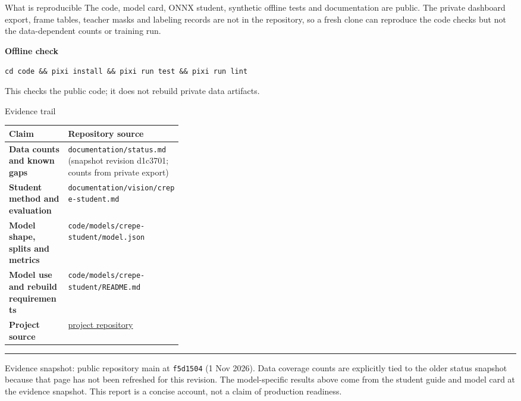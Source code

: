 \documentclass[10pt,a4paper]{article}
\makeatletter
\renewcommand\section{\@startsection{section}{1}{0pt}{9pt}{5pt}%
  {\normalfont\large\bfseries\color{ink}}}
\makeatother
\begin{document}
\section{What is reproducible}
The code, model card, ONNX student, synthetic offline tests and documentation
are public. The private dashboard export, frame tables, teacher masks and
labeling records are not in the repository, so a fresh clone can reproduce the
code checks but not the data-dependent counts or training run.

\colorbox{tealLight}{\parbox{\dimexpr\linewidth-2\fboxsep}{\small
\textbf{Offline check}\par
\texttt{cd code \&\& pixi install \&\& pixi run test \&\& pixi run lint}\par
This checks the public code; it does not rebuild private data artifacts.}}

\section{Evidence trail}
\small
\begin{tabularx}{\linewidth}{@{}
  >{\raggedright\arraybackslash\bfseries}p{0.34\linewidth}X@{}}
\toprule
Claim & Repository source \\
\midrule
Data counts and known gaps & \texttt{documentation/status.md} (snapshot
revision d1c3701; counts from private export) \\
Student method and evaluation &
\texttt{documentation/vision/crepe-student.md} \\
Model shape, splits and metrics &
\texttt{code/models/crepe-student/model.json} \\
Model use and rebuild requirements &
\texttt{code/models/crepe-student/README.md} \\
Project source &
\href{https://github.com/leonardoAB1/maus-crepe-insights}
{project repository} \\
\bottomrule
\end{tabularx}

\vfill
{\color{line}\rule{\linewidth}{0.6pt}}\par
{\scriptsize\color{muted}Evidence snapshot: public repository main at
\texttt{f5d1504} (1 Nov 2026). Data coverage counts are explicitly tied to the
older status snapshot because that page has not been refreshed for this
revision. The model-specific results above come from the student guide and
model card at the evidence snapshot. This report is a concise account, not a
claim of production readiness.}
\end{document}
